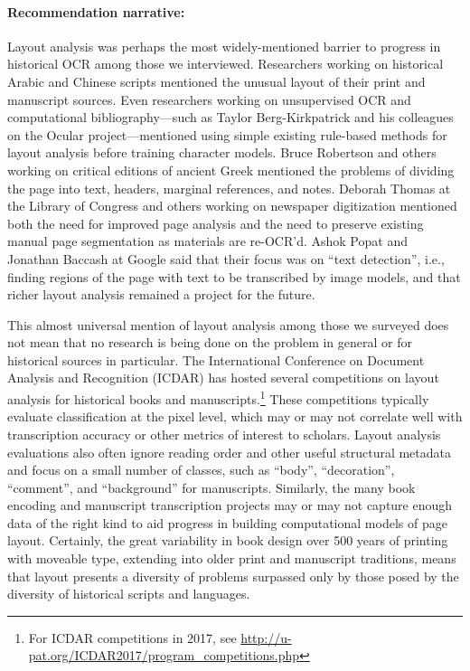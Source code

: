 \documentclass[twoside,11pt]{report}
\begin{document}
\paragraph{Recommendation narrative:}

Layout analysis was perhaps the most widely-mentioned barrier to progress in historical OCR among those we interviewed. Researchers working on historical Arabic and Chinese scripts mentioned the unusual layout of their print and manuscript sources. Even researchers working on unsupervised OCR and computational bibliography---such as Taylor Berg-Kirkpatrick and his colleagues on the Ocular project---mentioned using simple existing rule-based methods for layout analysis before training character models. Bruce Robertson and others working on critical editions of ancient Greek mentioned the problems of dividing the page into text, headers, marginal references, and notes. Deborah Thomas at the Library of Congress and others working on newspaper digitization mentioned both the need for improved page analysis and the need to preserve existing manual page segmentation as materials are re-OCR'd. Ashok Popat and Jonathan Baccash at Google said that their focus was on ``text detection'', i.e., finding regions of the page with text to be transcribed by image models, and that richer layout analysis remained a project for the future.

This almost universal mention of layout analysis among those we surveyed does not mean that no research is being done on the problem in general or for historical sources in particular. The International Conference on Document Analysis and Recognition (ICDAR) has hosted several competitions on layout analysis for historical books and manuscripts.\footnote{For ICDAR competitions in 2017, see \url{http://u-pat.org/ICDAR2017/program_competitions.php}}  These competitions typically evaluate classification at the pixel level, which may or may not correlate well with transcription accuracy or other metrics of interest to scholars. Layout analysis evaluations also often ignore reading order and other useful structural metadata and focus on a small number of classes, such as ``body'', ``decoration'', ``comment'', and ``background'' for manuscripts. Similarly, the many book encoding and manuscript transcription projects may or may not capture enough data of the right kind to aid progress in building computational models of page layout. Certainly, the great variability in book design over 500 years of printing with moveable type, extending into older print and manuscript traditions, means that layout presents a diversity of problems surpassed only by those posed by the diversity of historical scripts and languages.
\end{document}

